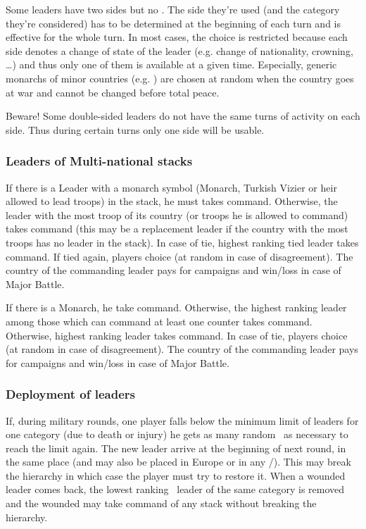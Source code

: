 \aparag Some leaders have two sides but no {\textetoile}.
\bparag The side they're used (and the category they're considered) has
to be determined at the beginning of each turn and is effective for the
whole turn.
\bparag In most cases, the choice is restricted because each side
denotes a change of state of the leader (e.g. change of nationality,
crowning, \ldots) and thus only one of them is available at a given
time.
\bparag Especially, generic monarchs of minor countries
(e.g. \leaderShah) are chosen at random when the country goes at war and
cannot be changed before total peace.

\aparag Beware! Some double-sided leaders do not have the same turns of
activity on each side. Thus during certain turns only one side will be
usable.

\subsubsection{Leaders of Multi-national stacks}\label{chMilitary:multi national}
\aparag[On land]
\bparag If there is a Leader with a monarch symbol (Monarch, Turkish Vizier or
heir allowed to lead troops) in the stack, he must takes command.
\bparag Otherwise, the leader with the most troop of its country (or troops he
is allowed to command) takes command (this may be a replacement leader if the
country with the most troops has no leader in the stack).
\bparag In case of tie, highest ranking tied leader takes command.
\bparag If tied again, players choice (at random in case of disagreement).
\bparag The country of the commanding leader pays for campaigns and win/loss
\STAB in case of Major Battle.

\aparag[At sea]
\bparag If there is a Monarch, he take command.
\bparag Otherwise, the highest ranking leader among those which can command at
least one \FLEET counter takes command.
\bparag Otherwise, highest ranking leader takes command.
\bparag In case of tie, players choice (at random in case of disagreement).
\bparag The country of the commanding leader pays for campaigns and win/loss
\STAB in case of Major Battle.

\subsubsection{Deployment of leaders}
\bparag If, during military rounds, one player falls below the minimum limit
of leaders for one category (due to death or injury) he gets as many random
\anonyme\ as necessary to reach the limit again.
\bparag The new leader arrive at the beginning of next round, in the same
place (\LeaderE and \LeaderC may also be placed in Europe or in any
\COL/\TP).
\bparag This may break the hierarchy in which case the player must try to
restore it.
\bparag When a wounded leader comes back, the lowest ranking \anonyme\ leader
of the same category is removed and the wounded may take command of any stack
without breaking the hierarchy.

